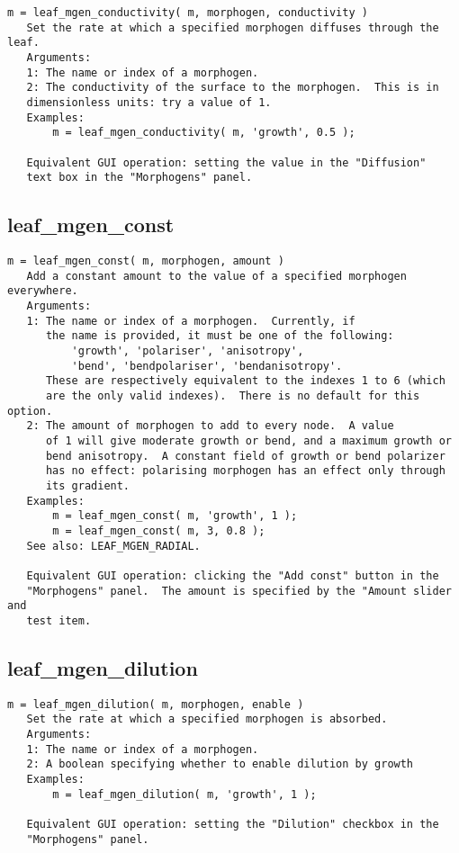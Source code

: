 \begin{verbatim}
m = leaf_mgen_conductivity( m, morphogen, conductivity )
   Set the rate at which a specified morphogen diffuses through the leaf.
   Arguments:
   1: The name or index of a morphogen.
   2: The conductivity of the surface to the morphogen.  This is in
   dimensionless units: try a value of 1.
   Examples:
       m = leaf_mgen_conductivity( m, 'growth', 0.5 );

   Equivalent GUI operation: setting the value in the "Diffusion"
   text box in the "Morphogens" panel.
\end{verbatim}

\subsection{leaf\_mgen\_const}\label{section-leaf-mgen-const}

\begin{verbatim}
m = leaf_mgen_const( m, morphogen, amount )
   Add a constant amount to the value of a specified morphogen everywhere.
   Arguments:
   1: The name or index of a morphogen.  Currently, if
      the name is provided, it must be one of the following:
          'growth', 'polariser', 'anisotropy',
          'bend', 'bendpolariser', 'bendanisotropy'.
      These are respectively equivalent to the indexes 1 to 6 (which
      are the only valid indexes).  There is no default for this option.
   2: The amount of morphogen to add to every node.  A value
      of 1 will give moderate growth or bend, and a maximum growth or
      bend anisotropy.  A constant field of growth or bend polarizer
      has no effect: polarising morphogen has an effect only through
      its gradient.
   Examples:
       m = leaf_mgen_const( m, 'growth', 1 );
       m = leaf_mgen_const( m, 3, 0.8 );
   See also: LEAF_MGEN_RADIAL.

   Equivalent GUI operation: clicking the "Add const" button in the
   "Morphogens" panel.  The amount is specified by the "Amount slider and
   test item.
\end{verbatim}

\subsection{leaf\_mgen\_dilution}\label{section-leaf-mgen-dilution}

\begin{verbatim}
m = leaf_mgen_dilution( m, morphogen, enable )
   Set the rate at which a specified morphogen is absorbed.
   Arguments:
   1: The name or index of a morphogen.
   2: A boolean specifying whether to enable dilution by growth
   Examples:
       m = leaf_mgen_dilution( m, 'growth', 1 );

   Equivalent GUI operation: setting the "Dilution" checkbox in the
   "Morphogens" panel.
\end{verbatim}

